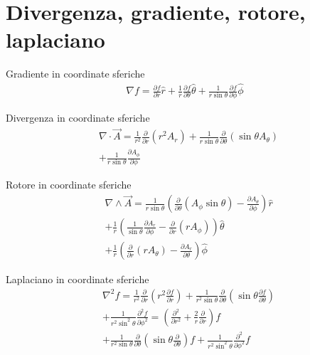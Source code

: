 \documentclass[main.tex]{subfiles}
\begin{document}
\section{Divergenza, gradiente, rotore, laplaciano}

\begin{usefull}{Gradiente in coordinate sferiche}
\begin{align*}
\nabla f=\frac{\partial f}{\partial r}\hat{r}+\frac{1}{r}\frac{\partial f}{\partial \theta}\hat{\theta}+\frac{1}{r\sin{\theta}}\frac{\partial f}{\partial \phi}\hat{\phi}    
\end{align*}
\end{usefull}

\begin{usefull}{Divergenza in coordinate sferiche}
\begin{align*}
&\nabla\cdot\vec{A}=\frac{1}{r^2}\frac{\partial}{\partial r}(r^2A_r)+\frac{1}{r\sin{\theta}}\frac{\partial }{\partial \theta}(\sin{\theta}A_{\theta})\\
&+\frac{1}{r\sin{\theta}}\frac{\partial A_{\phi}}{\partial \phi}
\end{align*}
\end{usefull}

\begin{usefull}{Rotore in coordinate sferiche}
\begin{align*}
&\nabla\wedge\vec{A}=\frac{1}{r\sin{\theta}}(\frac{\partial}{\partial \theta}(A_{\phi}\sin{\theta})-\frac{\partial A_{\theta}}{\partial \phi})\hat{r}\\
&+\frac{1}{r}(\frac{1}{\sin{\theta}}\frac{\partial A_r}{\partial \phi}-\frac{\partial}{\partial r}(rA_{\phi}))\hat{\theta}\\
&+\frac{1}{r}(\frac{\partial}{\partial r}(rA_{\theta})-\frac{\partial A_r}{\partial \theta})\hat{\phi}
\end{align*}
\end{usefull}

\begin{usefull}{Laplaciano in coordinate sferiche}
\begin{align*}
&\nabla^2f=\frac{1}{r^2}\frac{\partial}{\partial r}(r^2\frac{\partial f}{\partial r})+\frac{1}{r^2\sin{\theta}}\frac{\partial}{\partial \theta}(\sin{\theta}\frac{\partial f}{\partial \theta})\\
&+\frac{1}{r^2\sin^2{\theta}}\frac{\partial^2f}{\partial \phi^2}=(\frac{\partial^2}{\partial r^2}+\frac{2}{r}\frac{\partial}{\partial r})f\\
&+\frac{1}{r^2\sin{\theta}}\frac{\partial}{\partial\theta}(\sin{\theta}\frac{\partial}{\partial \theta})f+\frac{1}{r^2\sin^2{\theta}}\frac{\partial^2}{\partial \phi^2}f
\end{align*}

\end{usefull}
\end{document}
